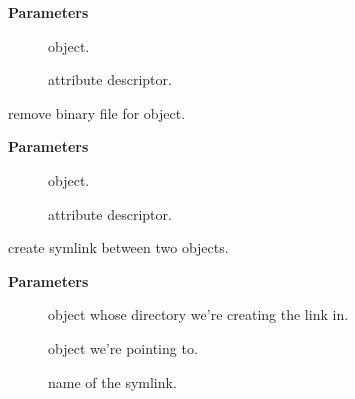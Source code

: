 \documentclass[a4paper,8pt,english]{sphinxmanual}
\begin{document}
\textbf{Parameters}
\begin{description}
\item[{}] \leavevmode
object.

\item[{}] \leavevmode
attribute descriptor.

\end{description}

\begin{fulllineitems}
\label{filesystems/index:c.sysfs_remove_bin_file}
remove binary file for object.

\end{fulllineitems}


\textbf{Parameters}
\begin{description}
\item[{}] \leavevmode
object.

\item[{}] \leavevmode
attribute descriptor.

\end{description}

\begin{fulllineitems}
\label{filesystems/index:c.sysfs_create_link}
create symlink between two objects.

\end{fulllineitems}


\textbf{Parameters}
\begin{description}
\item[{}] \leavevmode
object whose directory we're creating the link in.

\item[{}] \leavevmode
object we're pointing to.

\item[{}] \leavevmode
name of the symlink.

\end{description}
\end{document}
